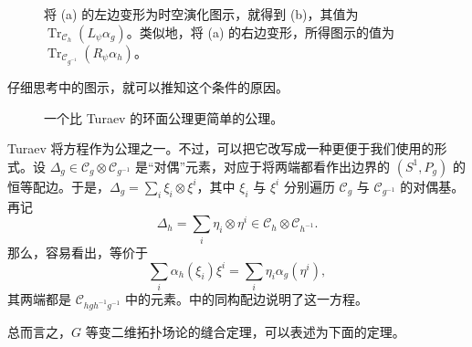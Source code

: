 \begin{figure}[H]
\centering
{}
\caption{将 (a) 的左边变形为时空演化图示，就得到 (b)，其值为 $\operatorname{Tr}_{\mathcal{C}_h}(L_\psi\alpha_g)$。类似地，将 (a) 的右边变形，所得图示的值为 $\operatorname{Tr}_{\mathcal{C}_{g^{-1}}}(R_\psi\alpha_h)$。}\label{fig:2.19}
\end{figure}

仔细思考中的图示，就可以推知这个条件的原因。

\begin{figure}[H]
\centering
{}
\caption{一个比 Turaev 的环面公理更简单的公理。}\label{fig:2.20}
\end{figure}

Turaev 将方程作为公理之一。不过，可以把它改写成一种更便于我们使用的形式。设 $\Delta_g\in\mathcal{C}_g\otimes\mathcal{C}_{g^{-1}}$ 是“对偶”元素，对应于将两端都看作出边界的 $(S^1,P_g)$ 的恒等配边。于是，$\Delta_g=\sum_i\xi_i\otimes\xi^i$，其中 $\xi_i$ 与 $\xi^i$ 分别遍历 $\mathcal{C}_g$ 与 $\mathcal{C}_{g^{-1}}$ 的对偶基。再记
\[
\Delta_h=\sum_i\eta_i\otimes\eta^i\in\mathcal{C}_h\otimes\mathcal{C}_{h^{-1}}.
\]
那么，容易看出，等价于
\begin{equation}\label{eq:2.84}
\sum_i\alpha_h(\xi_i)\xi^i=\sum_i\eta_i\alpha_g(\eta^i),
\end{equation}
其两端都是 $\mathcal{C}_{hgh^{-1}g^{-1}}$ 中的元素。中的同构配边说明了这一方程。

总而言之，$G$ 等变二维拓扑场论的缝合定理，可以表述为下面的定理。

